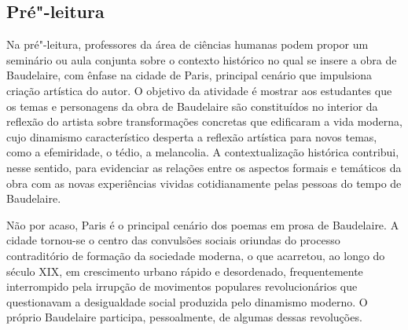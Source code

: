 \documentclass[12pt]{extarticle}
\begin{document}

\subsection{Pré"-leitura}



Na pré"-leitura, professores da área de ciências humanas
podem propor um seminário ou aula conjunta sobre o contexto histórico no qual se insere
a obra de Baudelaire, com ênfase na cidade de Paris, principal cenário que impulsiona criação artística do autor. 
O objetivo da atividade é mostrar aos estudantes que os temas e personagens da obra de Baudelaire são constituídos no interior da reflexão do artista sobre transformações concretas que edificaram a vida moderna, cujo dinamismo característico desperta a reflexão artística para novos temas, como a efemiridade, o tédio, a melancolia. A contextualização histórica contribui, nesse sentido, para evidenciar as relações entre os aspectos formais e temáticos da obra com as novas experiências vividas cotidianamente pelas pessoas do tempo de Baudelaire.

Não por acaso, Paris é o principal cenário dos poemas em prosa de Baudelaire. A cidade tornou-se o centro das convulsões sociais oriundas do processo contraditório de formação da sociedade moderna, o que acarretou, ao longo do século XIX, em crescimento urbano rápido e desordenado, frequentemente interrompido pela irrupção de movimentos populares revolucionários que questionavam a desigualdade social produzida pelo dinamismo moderno. O próprio Baudelaire participa, pessoalmente, de algumas dessas revoluções.
\end{document}
